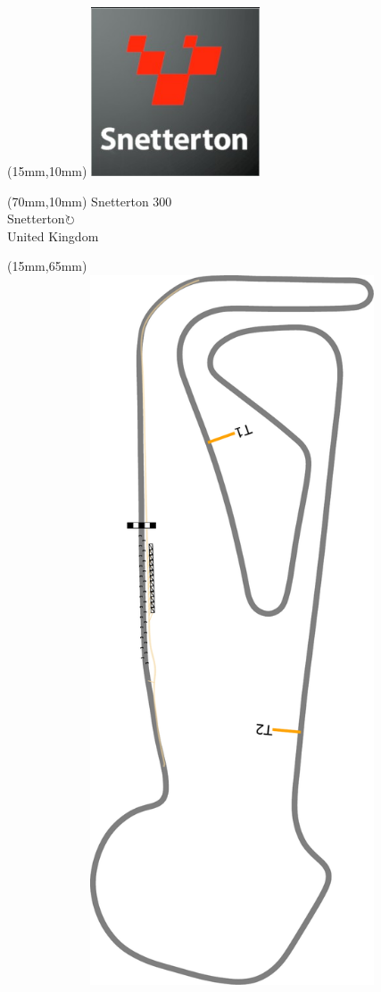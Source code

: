 \null\newpage
\begin{textblock*}{50mm}(15mm,10mm)%
\includegraphics[width=50mm]{LG/2015-05-20_00095.png}
\end{textblock*}
\begin{textblock*}{130mm}(70mm,10mm)%
{\fontsize{20}{20}\selectfont Snetterton 300\\}
{\fontsize{16}{16}\selectfont Snetterton\hfill \Large$\circlearrowright$\\}
{\fontsize{12}{12}\selectfont United Kingdom\\}
\end{textblock*}
\begin{textblock*}{185mm}(15mm,65mm)%
\centering
\mbox{\includegraphics[width=185mm,height=210mm,keepaspectratio]{PT/SN300.pdf}}
\end{textblock*}

